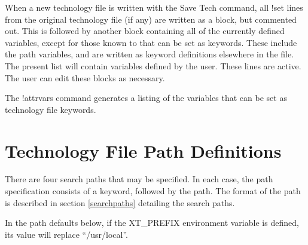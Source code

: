 When a new technology file is written with the {\cb Save Tech}
command, all {\cb !set} lines from the original technology file (if
any) are written as a block, but commented out.  This is followed by
another block containing all of the currently defined variables,
except for those known to {\Xic} that can be set as keywords.  These
include the path variables, and are written as keyword definitions
elsewhere in the file.  The present list will contain variables
defined by the user.  These lines are active.  The user can edit these
blocks as necessary.

The {\cb !attrvars} command generates a listing of the variables that
can be set as technology file keywords.


\section{Technology File Path Definitions}

There are four search paths that may be specified.  In each case, the
path specification consists of a keyword, followed by the path.  The
format of the path is described in section \ref{searchpaths}
detailing the {\Xic} search paths.

In the path defaults below, if the {\et XT\_PREFIX} environment
variable is defined, its value will replace ``{\vt /usr/local}''.

